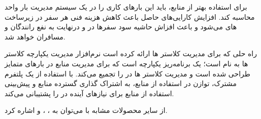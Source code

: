 برای استفاده بهتر از منابع، باید این بارهای کاری را در یک سیستم مدیریت بار واحد محاسبه کند. افزایش کارایی‌های حاصل باعث کاهش هزینه فنی هر سفر در زیرساخت های  می‌شود و باعث افزاش حاشیه سود سفر‌ها در  و درنهایت به نفع رانندگان و مسافران خواهد شد.

راه حلی که  برای مدیریت کلاستر ها ارائه کرده است نرم‌افزار مدیریت یکپارچه کلاستر ها به نام  است\cite{resource_uber}؛  یک برنامه‌ریز یکپارچه است که برای مدیریت منابع در بارهای متمایز طراحی شده است و مدیریت کلاستر ها در  را تجمیع می‌کند.  با استفاده از یک پلتفرم مشترک، توازن در استفاده از منابع، به اشتراک گذاری گسترده منابع و پیش‌بینی استفاده از منابع برای نیازهای آینده در  را پشتیبانی می‌کند.

از سایر محصولات مشابه با  می‌توان به \cite{verma2015large} ،\cite{kubernetes} ، \cite{hadoop} و \cite{aurora}\cite{mesos} اشاره کرد.













